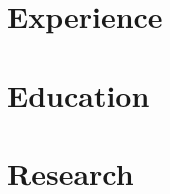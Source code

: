 \documentclass[letterpaper,11pt]{article}
\makeatletter
\newcommand{\resumeItem}[1]{
  \item\small{{#1 \vspace{-2pt}}}
}
\newcommand{\resumeSubheading}[4]{
  \vspace{-2pt}\item
    \begin{tabular*}{1.0\textwidth}[t]{l@{\extracolsep{\fill}}r}
      \textbf{#1} & \textbf{\small #2} \\
      \textit{\small#3} & \textit{\small #4} \\
    \end{tabular*}\vspace{-7pt}
}
\newcommand{\resumeSubheadingContinued}[3]{
  \vspace{4pt}
    \begin{tabular*}{1.0\textwidth}[t]{l@{\extracolsep{\fill}}r}
      & \textbf{\small #2} \\
      \textit{\small#1} & \textit{\small #3} \\
    \end{tabular*}\vspace{-7pt}
}
\newcommand{\resumeSubheadingDegree}[2]{
  \vspace{2pt}
    \begin{tabular*}{1.0\textwidth}[t]{l@{\extracolsep{\fill}}r}
      \textit{\small#1} & \textit{\small #2} \\
    \end{tabular*}\vspace{-7pt}
}
\newcommand{\resumeProjectHeading}[2]{
    \item
    \begin{tabularx}{1.001\textwidth}[t]{@{}>{\raggedright\arraybackslash}X@{\hspace{8pt}}r@{}}
      \small#1 & \textbf{\small #2}\\
    \end{tabularx}\vspace{-7pt}
}
\newcommand{\resumeSubHeadingListStart}{\begin{itemize}[leftmargin=0.0in, label={}]}
\newcommand{\resumeSubHeadingListEnd}{\end{itemize}}
\newcommand{\resumeItemListStart}{\begin{itemize}}
\newcommand{\resumeItemListEnd}{\end{itemize}\vspace{-5pt}}
\makeatother
\begin{document}
\section{Experience}
%
%
%
\vspace{-14pt}
 
\section{Education}
%
%
%
\vspace{-12pt}
 
\section{Research}
    \vspace{-5pt}
%
%
\vspace{-12pt}
 
\end{document}
